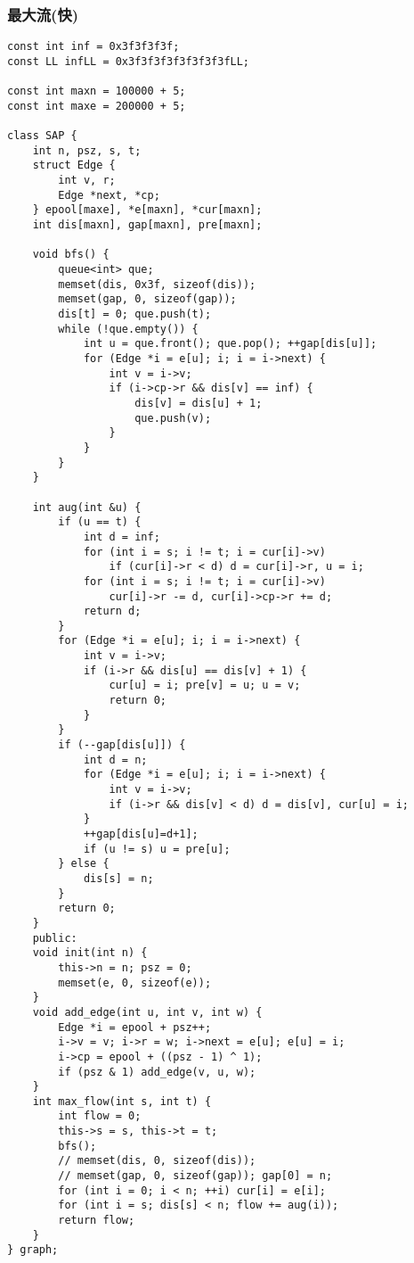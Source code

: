 \subsubsection{最大流(快)}
\begin{verbatim}
const int inf = 0x3f3f3f3f;
const LL infLL = 0x3f3f3f3f3f3f3f3fLL;

const int maxn = 100000 + 5;
const int maxe = 200000 + 5;

class SAP {
	int n, psz, s, t;
	struct Edge {
		int v, r;
		Edge *next, *cp;
	} epool[maxe], *e[maxn], *cur[maxn];
	int dis[maxn], gap[maxn], pre[maxn];

	void bfs() {
		queue<int> que;
		memset(dis, 0x3f, sizeof(dis));
		memset(gap, 0, sizeof(gap));
		dis[t] = 0; que.push(t);
		while (!que.empty()) {
			int u = que.front(); que.pop(); ++gap[dis[u]];
			for (Edge *i = e[u]; i; i = i->next) {
				int v = i->v;
				if (i->cp->r && dis[v] == inf) {
					dis[v] = dis[u] + 1;
					que.push(v);
				}
			}
		}
	}

	int aug(int &u) {
		if (u == t) {
			int d = inf;
			for (int i = s; i != t; i = cur[i]->v)
				if (cur[i]->r < d) d = cur[i]->r, u = i;
			for (int i = s; i != t; i = cur[i]->v)
				cur[i]->r -= d, cur[i]->cp->r += d;
			return d;
		}
		for (Edge *i = e[u]; i; i = i->next) {
			int v = i->v;
			if (i->r && dis[u] == dis[v] + 1) {
				cur[u] = i; pre[v] = u; u = v;
				return 0;
			}
		}
		if (--gap[dis[u]]) {
			int d = n;
			for (Edge *i = e[u]; i; i = i->next) {
				int v = i->v;
				if (i->r && dis[v] < d) d = dis[v], cur[u] = i;
			}
			++gap[dis[u]=d+1];
			if (u != s) u = pre[u];
		} else {
			dis[s] = n;
		}
		return 0;
	}
	public:
	void init(int n) {
		this->n = n; psz = 0;
		memset(e, 0, sizeof(e));
	}
	void add_edge(int u, int v, int w) {
		Edge *i = epool + psz++;
		i->v = v; i->r = w; i->next = e[u]; e[u] = i;
		i->cp = epool + ((psz - 1) ^ 1);
		if (psz & 1) add_edge(v, u, w);
	}
	int max_flow(int s, int t) {
		int flow = 0;
		this->s = s, this->t = t;
		bfs();
		// memset(dis, 0, sizeof(dis));
		// memset(gap, 0, sizeof(gap)); gap[0] = n;
		for (int i = 0; i < n; ++i) cur[i] = e[i];
		for (int i = s; dis[s] < n; flow += aug(i));
		return flow;
	}
} graph;
\end{verbatim}
